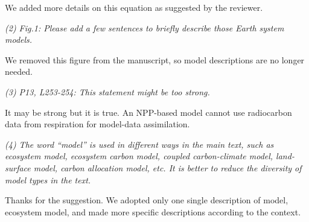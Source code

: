 We added more details on this equation as suggested by the reviewer.

\emph{(2) Fig.1: Please add a few sentences to briefly describe those
Earth system models.}

We removed this figure from the manuscript, so model descriptions are no
longer needed.

\emph{(3) P13, L253-254: This statement might be too strong.}

It may be strong but it is true. An NPP-based model cannot use
radiocarbon data from respiration for model-data assimilation.

\emph{(4) The word ``model'' is used in different ways in the main text,
such as ecosystem model, ecosystem carbon model, coupled carbon-climate
model, land-surface model, carbon allocation model, etc. It is better to
reduce the diversity of model types in the text.}

Thanks for the suggestion. We adopted only one single description of
model, ecosystem model, and made more specific descriptions according to
the context.

%
